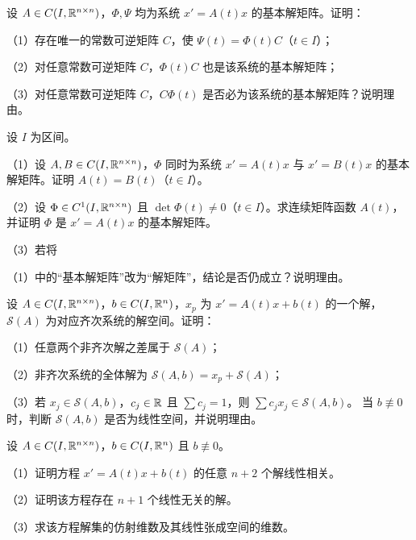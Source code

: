 \noindent\begin{minipage}{\linewidth}
设 $A\in C(I,\mathbb R^{n\times n})$，$\Phi,\Psi$ 均为系统 $x'=A(t)x$ 的基本解矩阵。证明：
\par（1）存在唯一的常数可逆矩阵 $C$，使 $\Psi(t)=\Phi(t)C$（$t\in I$）；
\par（2）对任意常数可逆矩阵 $C$，$\Phi(t)C$ 也是该系统的基本解矩阵；
\par（3）对任意常数可逆矩阵 $C$，$C\Phi(t)$ 是否必为该系统的基本解矩阵？说明理由。
\end{minipage}\par\vspace{5pt}
\noindent\begin{minipage}{\linewidth}
设 $I$ 为区间。
\par（1）设 $A,B\in C(I,\mathbb R^{n\times n})$，$\Phi$ 同时为系统 $x'=A(t)x$ 与 $x'=B(t)x$ 的基本解矩阵。证明 $A(t)=B(t)$（$t\in I$）。
\par（2）设 $\Phi\in C^1(I,\mathbb R^{n\times n})$ 且 $\det\Phi(t)\ne0$（$t\in I$）。求连续矩阵函数 $A(t)$，并证明 $\Phi$ 是 $x'=A(t)x$ 的基本解矩阵。
\par（3）若将\par（1）中的“基本解矩阵”改为“解矩阵”，结论是否仍成立？说明理由。
\end{minipage}\par\vspace{5pt}
\noindent\begin{minipage}{\linewidth}
设 $A\in C(I,\mathbb R^{n\times n})$，$b\in C(I,\mathbb R^n)$，$x_p$ 为 $x'=A(t)x+b(t)$ 的一个解，$\mathcal S(A)$ 为对应齐次系统的解空间。证明：
\par（1）任意两个非齐次解之差属于 $\mathcal S(A)$；
\par（2）非齐次系统的全体解为 $\mathcal S(A,b)=x_p+\mathcal S(A)$；
\par（3）若 $x_j\in\mathcal S(A,b)$，$c_j\in\mathbb R$ 且 $\sum c_j=1$，则 $\sum c_jx_j\in\mathcal S(A,b)$。
当 $b\not\equiv0$ 时，判断 $\mathcal S(A,b)$ 是否为线性空间，并说明理由。
\end{minipage}\par\vspace{5pt}
\noindent\begin{minipage}{\linewidth}
设 $A\in C(I,\mathbb R^{n\times n})$，$b\in C(I,\mathbb R^n)$ 且 $b\not\equiv0$。
\par（1）证明方程 $x'=A(t)x+b(t)$ 的任意 $n+2$ 个解线性相关。
\par（2）证明该方程存在 $n+1$ 个线性无关的解。
\par（3）求该方程解集的仿射维数及其线性张成空间的维数。
\end{minipage}\par\vspace{5pt}
